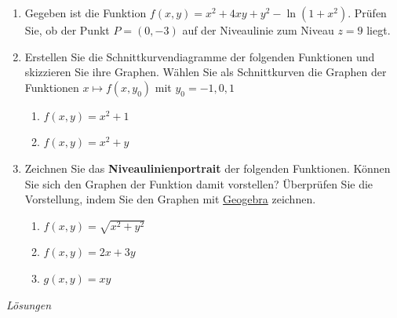 \begin{ueb}
	{}{}
	\begin{enumerate}
		\item Gegeben ist die Funktion \( f(x, y) = x^2 + 4xy + y^2 - \ln(1 + x^2) \). Prüfen Sie, ob der Punkt \( P = (0, -3) \) auf der Niveaulinie zum Niveau \( z = 9 \) liegt.

		\item Erstellen Sie die Schnittkurvendiagramme der folgenden Funktionen %
		      und skizzieren Sie ihre Graphen. Wählen Sie als Schnittkurven die Graphen der Funktionen $x \mapsto f(x, y_0)$ mit $y_0 = -1, 0, 1$
		      \begin{enumerate}
			      \item \( f(x, y) = x^2 + 1 \)
			      \item \( f(x, y) = x^2 + y \)
		      \end{enumerate}
		\item Zeichnen Sie das \textbf{Niveaulinienportrait} der folgenden Funktionen. Können Sie sich den Graphen der Funktion damit vorstellen? Überprüfen Sie die Vorstellung, indem Sie den Graphen mit \href{https://www.geogebra.org/calculator}{Geogebra} zeichnen.

		      \begin{enumerate}
			      \item \( f(x, y) = \sqrt{x^2 + y^2} \)
			      \item \( f(x, y) = 2x + 3y \)
			      \item \( g(x, y) = xy \)
		      \end{enumerate}
	\end{enumerate}
\end{ueb}
\clearpage
\emph{Lösungen}
